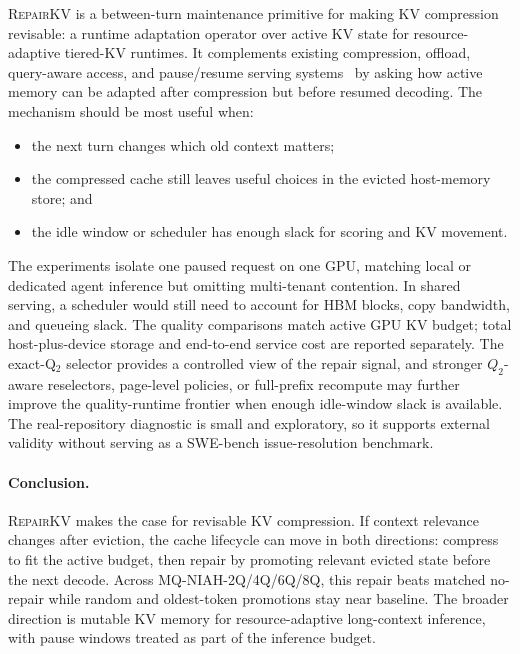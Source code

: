 \documentclass{article}
\newcommand{\repairkv}{\textsc{RepairKV}}
\begin{document}
\repairkv{} is a between-turn maintenance primitive for making KV
compression revisable: a runtime adaptation operator over active KV state
for resource-adaptive tiered-KV runtimes.
It complements existing compression, offload, query-aware access, and
pause/resume serving systems~\citep{vllm,infercept,lmcache,ttkv,
continuum,agentserve} by asking how active memory can be adapted after
compression but before resumed decoding.
The mechanism should be most useful when:
\begin{itemize}[leftmargin=1.4em,noitemsep,topsep=2pt]
  \item the next turn changes which old context matters;
  \item the compressed cache still leaves useful choices in the evicted host-memory store; and
  \item the idle window or scheduler has enough slack for scoring and KV
  movement.
\end{itemize}
The experiments isolate one paused request on one GPU, matching local or
dedicated agent inference but omitting multi-tenant contention.
In shared serving, a scheduler would still need to account for HBM blocks,
copy bandwidth, and queueing slack.
The quality comparisons match active GPU KV budget; total
host-plus-device storage and end-to-end service cost are reported
separately.
The exact-Q$_2$ selector provides a controlled view of the
repair signal, and stronger $Q_2$-aware reselectors, page-level policies,
or full-prefix recompute may further improve the quality-runtime frontier
when enough idle-window slack is available.
The real-repository diagnostic is small and exploratory, so it supports
external validity without serving as a SWE-bench issue-resolution
benchmark.
\paragraph{Conclusion.}
\repairkv{} makes the case for revisable KV compression.
If context relevance changes after eviction, the cache lifecycle can move
in both directions: compress to fit the active budget, then repair by
promoting relevant evicted state before the next decode.
Across MQ-NIAH-2Q/4Q/6Q/8Q, this repair beats matched no-repair while random
and oldest-token promotions stay near baseline.
The broader direction is mutable KV memory for resource-adaptive
long-context inference, with pause windows treated as part of the
inference budget.
\end{document}
